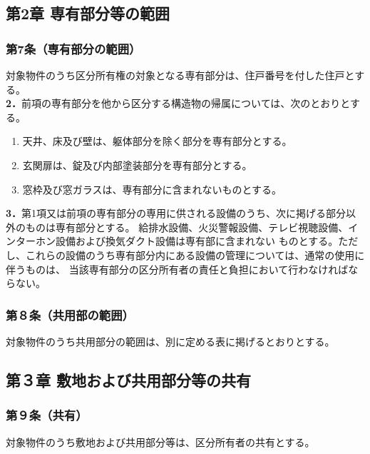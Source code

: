 \documentclass[12pt,uplatex,dvipdfmx]{jsarticle}
\begin{document}
\begin{center}
\subsection*{第2章 専有部分等の範囲}
\end{center}
\subsubsection*{ 第7条（専有部分の範囲）}
対象物件のうち区分所有権の対象となる専有部分は、住戸番号を付した住戸とする。\\
\textbf{2．}前項の専有部分を他から区分する構造物の帰属については、次のとおりとする。
\begin{enumerate}
\item 天井、床及び壁は、躯体部分を除く部分を専有部分とする。
\item 玄関扉は、錠及び内部塗装部分を専有部分とする。
\item 窓枠及び窓ガラスは、専有部分に含まれないものとする。 
\end{enumerate}
\textbf{3．}第1項又は前項の専有部分の専用に供される設備のうち、次に掲げる部分以外のものは専有部分とする。
給排水設備、火災警報設備、テレビ視聴設備、インターホン設備および換気ダクト設備は専有部に含まれない
ものとする。ただし、これらの設備のうち専有部分内にある設備の管理については、通常の使用に伴うものは、
当該専有部分の区分所有者の責任と負担において行わなければならない。
\subsubsection*{第８条（共用部の範囲）}
対象物件のうち共用部分の範囲は、別に定める表に掲げるとおりとする。

\begin{center}
\subsection*{第３章 敷地および共用部分等の共有}
\end{center}
\subsubsection*{第９条（共有）}
対象物件のうち敷地および共用部分等は、区分所有者の共有とする。
\end{document}

